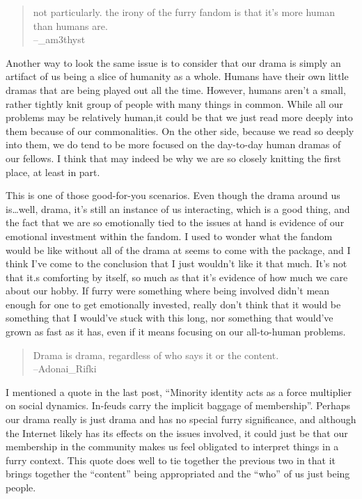 \begin{quote}
  not particularly. the irony of the furry fandom is that it's more human than humans are.\\
  --\_am3thyst
\end{quote}

Another way to look the same issue is to consider that our drama is simply an artifact of us being a slice of humanity as a whole. Humans have their own little dramas that are being played out all the time. However, humans aren't a small, rather tightly knit group of people with many things in common. While all our problems may be relatively human,it could be that we just read more deeply into them because of our commonalities. On the other side, because we read so deeply into them, we do tend to be more focused on the day-to-day human dramas of our fellows. I think that may indeed be why we are so closely knitting the first place, at least in part.

This is one of those good-for-you scenarios. Even though the drama around us is\ldots well, drama, it's still an instance of us interacting, which is a good thing, and the fact that we are so emotionally tied to the issues at hand is evidence of our emotional investment within the fandom.  I used to wonder what the fandom would be like without all of the drama at seems to come with the package, and I think I've come to the conclusion that I just wouldn't like it that much. It's not that it.s comforting by itself, so much as that it's evidence of how much we care about our hobby. If furry were something where being involved didn't mean enough for one to get emotionally invested, really don't think that it would be something that I would've stuck with this long, nor something that would've grown as fast as it has, even if it means focusing on our all-to-human problems.

\begin{quote}
  Drama is drama, regardless of who says it or the content.\\
  --Adonai\_Rifki
\end{quote}

I mentioned a quote in the last post, ``Minority identity acts as a force multiplier on social dynamics. In-feuds carry the implicit baggage of membership''.  Perhaps our drama really is just drama and has no special furry significance, and although the Internet likely has its effects on the issues involved, it could just be that our membership in the community makes us feel obligated to interpret things in a furry context. This quote does well to tie together the previous two in that it brings together the ``content'' being appropriated and the ``who'' of us just being people.

